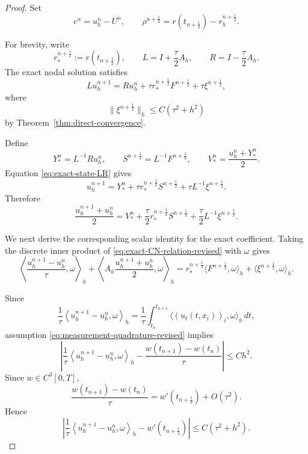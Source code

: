\documentclass[10pt,a4paper]{amsart}
\begin{document}
\begin{proof}
Set
\[
e^n=u_h^n-U^n,
\qquad
\rho^{n+\frac12}
=
r(t_{n+\frac12})-r_h^{n+\frac12}.
\]

For brevity, write
\[
r_*^{n+\frac12}:=r(t_{n+\frac12}),
\qquad
L=I+\frac{\tau}{2}A_h,
\qquad
R=I-\frac{\tau}{2}A_h.
\]
The exact nodal solution satisfies
\begin{equation}
Lu_h^{n+1}
=
Ru_h^n
+
\tau r_*^{n+\frac12}F^{n+\frac12}
+
\tau\xi^{n+\frac12},
\label{eq:exact-state-LR}
\end{equation}
where
\begin{equation}
\|\xi^{n+\frac12}\|_h
\le
C(\tau^2+h^2)
\label{eq:inverse-defect-bound}
\end{equation}
by Theorem~\ref{thm:direct-convergence}.

Define
\[
Y_*^n=L^{-1}Ru_h^n,
\qquad
S^{n+\frac12}=L^{-1}F^{n+\frac12},
\qquad
V_*^n=\frac{u_h^n+Y_*^n}{2}.
\]
Equation \eqref{eq:exact-state-LR} gives
\[
u_h^{n+1}
=
Y_*^n
+
\tau r_*^{n+\frac12}S^{n+\frac12}
+
\tau L^{-1}\xi^{n+\frac12}.
\]
Therefore
\begin{equation}
\frac{u_h^{n+1}+u_h^n}{2}
=
V_*^n
+
\frac{\tau}{2}
r_*^{n+\frac12}S^{n+\frac12}
+
\frac{\tau}{2}L^{-1}\xi^{n+\frac12}.
\label{eq:exact-midpoint-state}
\end{equation}

We next derive the corresponding scalar identity for the exact
coefficient. Taking the discrete inner product of
\eqref{eq:exact-CN-relation-revised} with \(\omega\) gives
\begin{equation}
\left\langle
\frac{u_h^{n+1}-u_h^n}{\tau},
\omega
\right\rangle_h
+
\left\langle
A_h\frac{u_h^{n+1}+u_h^n}{2},
\omega
\right\rangle_h
=
r_*^{n+\frac12}
\langle F^{n+\frac12},\omega\rangle_h
+
\langle\xi^{n+\frac12},\omega\rangle_h.
\label{eq:exact-measurement-discrete}
\end{equation}

Since
\[
\frac{1}{\tau}
\left\langle
u_h^{n+1}-u_h^n,\omega
\right\rangle_h
=
\frac{1}{\tau}
\int_{t_n}^{t_{n+1}}
\langle (u_t(t,x_i))_i,\omega\rangle_h\,dt,
\]
assumption \eqref{eq:measurement-quadrature-revised} implies
\[
\left|
\frac{1}{\tau}
\left\langle
u_h^{n+1}-u_h^n,\omega
\right\rangle_h
-
\frac{w(t_{n+1})-w(t_n)}{\tau}
\right|
\le
C h^2.
\]
Since \(w\in C^3[0,T]\),
\[
\frac{w(t_{n+1})-w(t_n)}{\tau}
=
w'(t_{n+\frac12})
+
O(\tau^2).
\]
Hence
\begin{equation}
\left|
\frac{1}{\tau}
\left\langle
u_h^{n+1}-u_h^n,\omega
\right\rangle_h
-
w'(t_{n+\frac12})
\right|
\le
C(\tau^2+h^2).
\label{eq:measurement-difference-bound}
\end{equation}


\end{proof}
\end{document}
